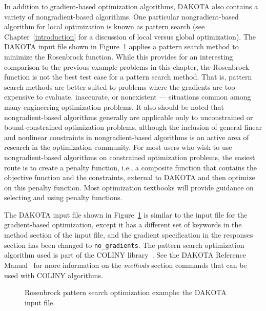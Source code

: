 In addition to gradient-based optimization algorithms, DAKOTA also
contains a variety of nongradient-based algorithms. One particular
nongradient-based algorithm for local optimization is known as pattern
search (see Chapter~\ref{introduction} for a discussion of local
versus global optimization). The DAKOTA input file shown in
Figure~\ref{tutorial:rosenbrock_patternsearch} applies a pattern
search method to minimize the Rosenbrock function.  While this
provides for an interesting comparison to the previous example
problems in this chapter, the Rosenbrock function is not the best test
case for a pattern search method. That is, pattern search methods are
better suited to problems where the gradients are too expensive to
evaluate, inaccurate, or nonexistent --- situations common among many
engineering optimization problems. It also should be noted that
nongradient-based algorithms generally are applicable only to
unconstrained or bound-constrained optimization problems, although the
inclusion of general linear and nonlinear constraints in
nongradient-based algorithms is an active area of research in the
optimization community. For most users who wish to use
nongradient-based algorithms on constrained optimization problems, the
easiest route is to create a penalty function, i.e., a composite
function that contains the objective function and the constraints,
external to DAKOTA and then optimize on this penalty function. Most
optimization textbooks will provide guidance on selecting and using
penalty functions.

The DAKOTA input file shown in
Figure~\ref{tutorial:rosenbrock_patternsearch} is similar to the
input file for the gradient-based optimization, except it has a
different set of keywords in the method section of the input file, and
the gradient specification in the responses section has been changed
to \texttt{no\_gradients}. The pattern search optimization algorithm
used is part of the COLINY library~\cite{Har06}.  See the DAKOTA
Reference Manual~\cite{RefMan} for more information on the
\emph{methods} section commands that can be used with COLINY
algorithms.

\begin{figure}[ht!]
  \centering
  \begin{bigbox}
    \begin{small}
    \end{small}
  \end{bigbox}
  \caption{Rosenbrock pattern search optimization example: the DAKOTA input file.}
  \label{tutorial:rosenbrock_patternsearch}
\end{figure}

